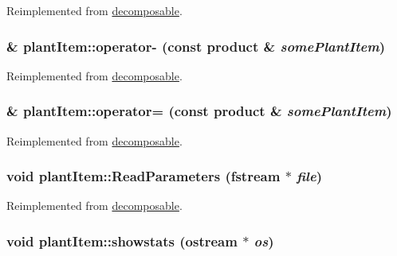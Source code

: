 Reimplemented from \hyperlink{classdecomposable_a3ce2092217848b27b52fc54327c8ad53}{decomposable}.\hypertarget{classplant_item_a3ca74628fd07b229a871ac0f80e31a41}{
\subsubsection[{operator-\/}]{ \& plantItem::operator-\/ (const {\bf product} \& {\em somePlantItem})}}
\label{classplant_item_a3ca74628fd07b229a871ac0f80e31a41}


Reimplemented from \hyperlink{classdecomposable_a2af3d9d773f8cdf8d84ce51ed5c470ff}{decomposable}.\hypertarget{classplant_item_a8f1788f9c6299d63ad1fa4add42c0fe2}{
\subsubsection[{operator=}]{ \& plantItem::operator= (const {\bf product} \& {\em somePlantItem})}}
\label{classplant_item_a8f1788f9c6299d63ad1fa4add42c0fe2}


Reimplemented from \hyperlink{classdecomposable_a296f63c98dd6712bfc375287c6123ea7}{decomposable}.\hypertarget{classplant_item_a6ed5a9408b471bb44246e5c50e93b72f}{
\subsubsection[{ReadParameters}]{\setlength{\rightskip}{0pt plus 5cm}void plantItem::ReadParameters (fstream $\ast$ {\em file})}}
\label{classplant_item_a6ed5a9408b471bb44246e5c50e93b72f}


Reimplemented from \hyperlink{classdecomposable_a79e5c1092b6c8f3e9f233a26ed308c63}{decomposable}.\hypertarget{classplant_item_af4591feee9c292842152a6451d392d33}{
\subsubsection[{showstats}]{\setlength{\rightskip}{0pt plus 5cm}void plantItem::showstats (ostream $\ast$ {\em os})}}
\label{classplant_item_af4591feee9c292842152a6451d392d33}


